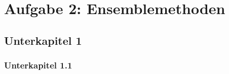 \pagebreak
\section{Aufgabe 2: Ensemblemethoden}
\subsection{Unterkapitel 1}
\subsubsection{Unterkapitel 1.1}
